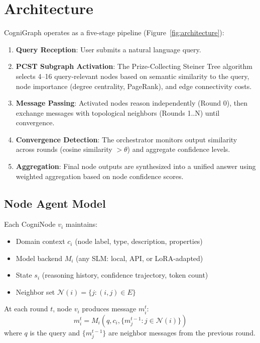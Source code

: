 \documentclass[11pt,a4paper]{article}
\begin{document}
\section{Architecture}
\label{sec:architecture}

CogniGraph operates as a five-stage pipeline (Figure~\ref{fig:architecture}):

\begin{enumerate}
    \item \textbf{Query Reception}: User submits a natural language query.
    \item \textbf{PCST Subgraph Activation}: The Prize-Collecting Steiner Tree algorithm selects 4--16 query-relevant nodes based on semantic similarity to the query, node importance (degree centrality, PageRank), and edge connectivity costs.
    \item \textbf{Message Passing}: Activated nodes reason independently (Round 0), then exchange messages with topological neighbors (Rounds 1..N) until convergence.
    \item \textbf{Convergence Detection}: The orchestrator monitors output similarity across rounds (cosine similarity $> \theta$) and aggregate confidence levels.
    \item \textbf{Aggregation}: Final node outputs are synthesized into a unified answer using weighted aggregation based on node confidence scores.
\end{enumerate}

\subsection{Node Agent Model}
Each CogniNode $v_i$ maintains:
\begin{itemize}
    \item Domain context $c_i$ (node label, type, description, properties)
    \item Model backend $M_i$ (any SLM: local, API, or LoRA-adapted)
    \item State $s_i$ (reasoning history, confidence trajectory, token count)
    \item Neighbor set $\mathcal{N}(i) = \{j : (i,j) \in E\}$
\end{itemize}

At each round $t$, node $v_i$ produces message $m_i^t$:
\begin{equation}
    m_i^t = M_i\left(q, c_i, \{m_j^{t-1} : j \in \mathcal{N}(i)\}\right)
\end{equation}
where $q$ is the query and $\{m_j^{t-1}\}$ are neighbor messages from the previous round.
\end{document}
